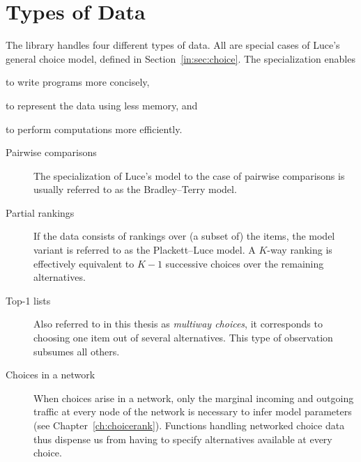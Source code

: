 \section{Types of Data}

The library handles four different types of data.
All are special cases of Luce's general choice model, defined in Section~\ref{in:sec:choice}.
The specialization enables
\begin{enuminline}
\item to write programs more concisely,
\item to represent the data using less memory, and
\item to perform computations more efficiently.
\end{enuminline}

\begin{description}
\item[Pairwise comparisons] The specialization of Luce's model to the case of pairwise comparisons is usually referred to as the Bradley--Terry model.

\item[Partial rankings] If the data consists of rankings over (a subset of) the items, the model variant is referred to as the Plackett--Luce model.
A $K$-way ranking is effectively equivalent to $K-1$ successive choices over the remaining alternatives.

\item[Top-1 lists] Also referred to in this thesis as \emph{multiway choices}, it corresponds to choosing one item out of several alternatives.
This type of observation subsumes all others.

\item[Choices in a network] When choices arise in a network, only the marginal incoming and outgoing traffic at every node of the network is necessary to infer model parameters (see Chapter~\ref{ch:choicerank}).
Functions handling networked choice data thus dispense us from having to specify alternatives available at every choice.
\end{description}
